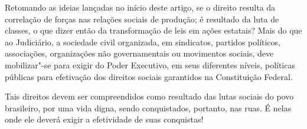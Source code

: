 Retomando as ideias lançadas no início deste artigo, se o direito
resulta da correlação de forças nas relações sociais de produção; é
resultado da luta de classes, o que dizer então da transformação de leis
em ações estatais? Mais do que ao Judiciário, a sociedade civil
organizada, em sindicatos, partidos políticos, associações, organizações
não governamentais ou movimentos sociais, deve mobilizar"-se para exigir
do Poder Executivo, em seus diferentes níveis, políticas públicas para
efetivação dos direitos sociais garantidos na Constituição Federal.

Tais direitos devem ser compreendidos como resultado das lutas sociais
do povo brasileiro, por uma vida digna, sendo conquistados, portanto,
nas ruas. É nelas onde ele deverá exigir a efetividade de suas
conquistas!
